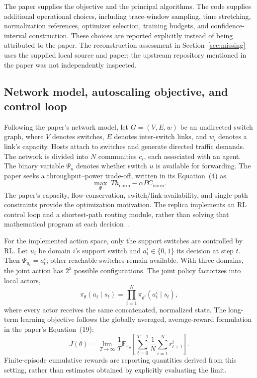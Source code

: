 \documentclass[11pt,a4paper]{article}
\begin{document}
The paper supplies the objective and the principal algorithms. The code supplies
additional operational choices, including trace-window sampling, time
stretching, normalization references, optimizer selection, training budgets,
and confidence-interval construction. These choices are reported explicitly
instead of being attributed to the paper. The reconstruction assessment in
Section~\ref{sec:missing} uses the supplied local source and paper; the upstream
repository mentioned in the paper was not independently inspected.

\subsection{Network model, autoscaling objective, and control loop}

Following the paper's network model, let $G=(V,E,w)$ be an undirected switch
graph, where $V$ denotes switches, $E$ denotes inter-switch links, and $w_l$
denotes a link's capacity. Hosts attach to switches and generate directed
traffic demands. The network is divided into $N$ communities $c_i$, each
associated with an agent. The binary variable $\Psi_u$ denotes whether switch
$u$ is available for forwarding. The paper seeks a throughput--power trade-off,
written in its Equation~(4) as
\begin{equation}
  \max_{\Psi}\; Th_{\mathrm{norm}}-\alpha PC_{\mathrm{norm}}.
  \label{eq:objective}
\end{equation}
The paper's capacity, flow-conservation, switch/link-availability, and
single-path constraints provide the optimization motivation. The replica
implements an RL control loop and a shortest-path routing module, rather than
solving that mathematical program at each decision~\cite{paper,code-routing}.

For the implemented action space, only the support switches are controlled by
RL. Let $u_i$ be domain $i$'s support switch and $a_t^i\in\{0,1\}$ its decision
at step $t$. Then $\Psi_{u_i}=a_t^i$; other reachable switches remain available.
With three domains, the joint action has $2^3$ possible configurations. The
joint policy factorizes into local actors,
\begin{equation}
  \pi_\theta(a_t\mid s_t)=\prod_{i=1}^{N}
  \pi_{\theta^i}(a_t^i\mid s_t),
\end{equation}
where every actor receives the same concatenated, normalized state. The
long-term learning objective follows the globally averaged, average-reward
formulation in the paper's Equation~(19):
\begin{equation}
 J(\theta)=\lim_{T\rightarrow\infty}\frac{1}{T}
 \mathbb{E}_{\pi_\theta}\left[
   \sum_{t=0}^{T-1}\frac{1}{N}\sum_{i=1}^{N}r_{t+1}^i
 \right].
 \label{eq:average-objective}
\end{equation}
Finite-episode cumulative rewards are reporting quantities derived from this
setting, rather than estimates obtained by explicitly evaluating the limit.
\end{document}
